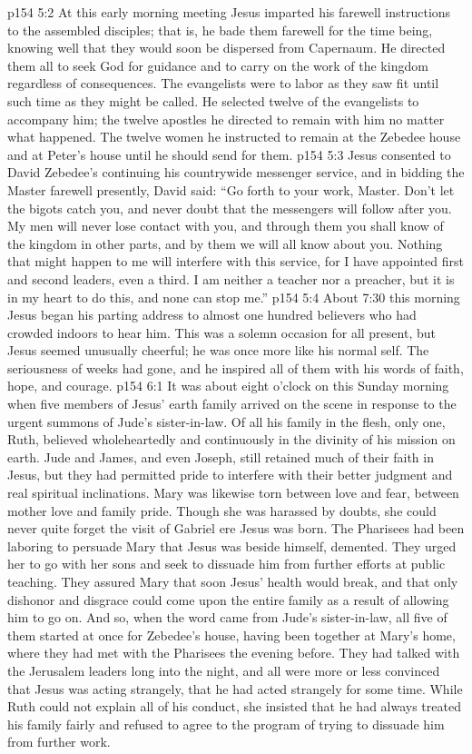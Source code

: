 \vs p154 5:2 At this early morning meeting Jesus imparted his farewell instructions to the assembled disciples; that is, he bade them farewell for the time being, knowing well that they would soon be dispersed from Capernaum. He directed them all to seek God for guidance and to carry on the work of the kingdom regardless of consequences. The evangelists were to labor as they saw fit until such time as they might be called. He selected twelve of the evangelists to accompany him; the twelve apostles he directed to remain with him no matter what happened. The twelve women he instructed to remain at the Zebedee house and at Peter’s house until he should send for them.
\vs p154 5:3 Jesus consented to David Zebedee’s continuing his countrywide messenger service, and in bidding the Master farewell presently, David said: “Go forth to your work, Master. Don’t let the bigots catch you, and never doubt that the messengers will follow after you. My men will never lose contact with you, and through them you shall know of the kingdom in other parts, and by them we will all know about you. Nothing that might happen to me will interfere with this service, for I have appointed first and second leaders, even a third. I am neither a teacher nor a preacher, but it is in my heart to do this, and none can stop me.”
\vs p154 5:4 About 7:30 this morning Jesus began his parting address to almost one hundred believers who had crowded indoors to hear him. This was a solemn occasion for all present, but Jesus seemed unusually cheerful; he was once more like his normal self. The seriousness of weeks had gone, and he inspired all of them with his words of faith, hope, and courage.
\vs p154 6:1 It was about eight o’clock on this Sunday morning when five members of Jesus’ earth family arrived on the scene in response to the urgent summons of Jude’s sister\hyp{}in\hyp{}law. Of all his family in the flesh, only one, Ruth, believed wholeheartedly and continuously in the divinity of his mission on earth. Jude and James, and even Joseph, still retained much of their faith in Jesus, but they had permitted pride to interfere with their better judgment and real spiritual inclinations. Mary was likewise torn between love and fear, between mother love and family pride. Though she was harassed by doubts, she could never quite forget the visit of Gabriel ere Jesus was born. The Pharisees had been laboring to persuade Mary that Jesus was beside himself, demented. They urged her to go with her sons and seek to dissuade him from further efforts at public teaching. They assured Mary that soon Jesus’ health would break, and that only dishonor and disgrace could come upon the entire family as a result of allowing him to go on. And so, when the word came from Jude’s sister\hyp{}in\hyp{}law, all five of them started at once for Zebedee’s house, having been together at Mary’s home, where they had met with the Pharisees the evening before. They had talked with the Jerusalem leaders long into the night, and all were more or less convinced that Jesus was acting strangely, that he had acted strangely for some time. While Ruth could not explain all of his conduct, she insisted that he had always treated his family fairly and refused to agree to the program of trying to dissuade him from further work.
